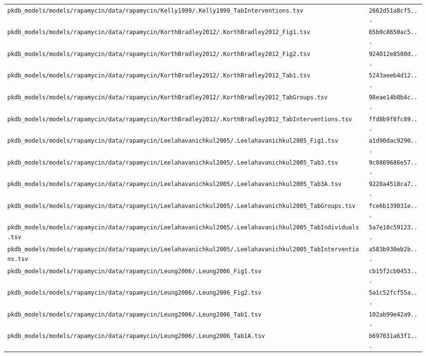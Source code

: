 \documentclass{article}
\begin{document}
\begin{longtable}{ll}
\texttt{pkdb\_models/models/rapamycin/data/rapamycin/Kelly1999/.Kelly1999\_TabInterventions.tsv} & \texttt{2662d51a8cf5...} \\
\texttt{pkdb\_models/models/rapamycin/data/rapamycin/KorthBradley2012/.KorthBradley2012\_Fig1.tsv} & \texttt{65b0c8650ac5...} \\
\texttt{pkdb\_models/models/rapamycin/data/rapamycin/KorthBradley2012/.KorthBradley2012\_Fig2.tsv} & \texttt{924012e8580d...} \\
\texttt{pkdb\_models/models/rapamycin/data/rapamycin/KorthBradley2012/.KorthBradley2012\_Tab1.tsv} & \texttt{5243aeeb4d12...} \\
\texttt{pkdb\_models/models/rapamycin/data/rapamycin/KorthBradley2012/.KorthBradley2012\_TabGroups.tsv} & \texttt{98eae14b8b4c...} \\
\texttt{pkdb\_models/models/rapamycin/data/rapamycin/KorthBradley2012/.KorthBradley2012\_TabInterventions.tsv} & \texttt{ffd8b9f8fc89...} \\
\texttt{pkdb\_models/models/rapamycin/data/rapamycin/Leelahavanichkul2005/.Leelahavanichkul2005\_Fig1.tsv} & \texttt{a1d90dac9290...} \\
\texttt{pkdb\_models/models/rapamycin/data/rapamycin/Leelahavanichkul2005/.Leelahavanichkul2005\_Tab3.tsv} & \texttt{9c0869686e57...} \\
\texttt{pkdb\_models/models/rapamycin/data/rapamycin/Leelahavanichkul2005/.Leelahavanichkul2005\_Tab3A.tsv} & \texttt{9228a4518ca7...} \\
\texttt{pkdb\_models/models/rapamycin/data/rapamycin/Leelahavanichkul2005/.Leelahavanichkul2005\_TabGroups.tsv} & \texttt{fce6b139031e...} \\
\texttt{pkdb\_models/models/rapamycin/data/rapamycin/Leelahavanichkul2005/.Leelahavanichkul2005\_TabIndividuals.tsv} & \texttt{5a7e18c59123...} \\
\texttt{pkdb\_models/models/rapamycin/data/rapamycin/Leelahavanichkul2005/.Leelahavanichkul2005\_TabInterventions.tsv} & \texttt{a583b930eb2b...} \\
\texttt{pkdb\_models/models/rapamycin/data/rapamycin/Leung2006/.Leung2006\_Fig1.tsv} & \texttt{cb15f2cb0453...} \\
\texttt{pkdb\_models/models/rapamycin/data/rapamycin/Leung2006/.Leung2006\_Fig2.tsv} & \texttt{5a1c52fcf55a...} \\
\texttt{pkdb\_models/models/rapamycin/data/rapamycin/Leung2006/.Leung2006\_Tab1.tsv} & \texttt{102ab99e42a9...} \\
\texttt{pkdb\_models/models/rapamycin/data/rapamycin/Leung2006/.Leung2006\_Tab1A.tsv} & \texttt{b697031a63f1...} \\

\end{longtable}
\end{document}
